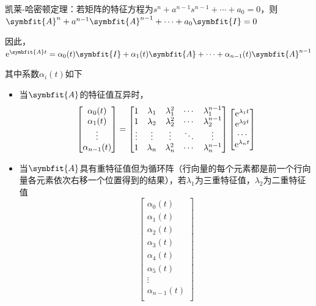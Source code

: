 \documentclass[11pt,a4paper]{ctexart}
\newcommand{\e}{{\rm e}}
\newcommand{\bm}{\symbfit}
\begin{document}
\begin{itemize}
            凯莱-哈密顿定理：若矩阵的特征方程为$s^n+a^{n-1}s^{n-1}+\cdots+a_0=0$，则$\bm{A}^n+a^{n-1}\bm{A}^{n-1}+\cdots+a_0\bm{I}=0$

            因此，$\e^{\bm{A}t}=\alpha_0(t)\bm{I}+\alpha_1(t)\bm{A}+\cdots+\alpha_{n-1}(t)\bm{A}^{n-1}$

            其中系数$\alpha_i(t)$如下
            \begin{itemize}
                \item 当$\bm{A}$的特征值互异时，
                \[
                \begin{bmatrix}
                    \alpha_0(t)\\\alpha_1(t)\\\vdots\\\alpha_{n-1}(t)
                \end{bmatrix}=
                \begin{bmatrix}
                    1 & \lambda_1 & \lambda_1^2 & \cdots & \lambda_1^{n-1}\\
                    1 & \lambda_2 & \lambda_2^2 & \cdots & \lambda_2^{n-1}\\
                    \vdots & \vdots & \vdots & \ddots & \vdots \\
                    1 & \lambda_n & \lambda_n^2 & \cdots & \lambda_n^{n-1}\\
                \end{bmatrix}
                \begin{bmatrix}
                    \e^{\lambda_1t}\\ \e^{\lambda_2t}\\ \cdots \\ \e^{\lambda_nt} \\
                \end{bmatrix}
                \]
                \item 当$\bm{A}$具有重特征值但为循环阵（行向量的每个元素都是前一个行向量各元素依次右移一个位置得到的结果），若$\lambda_1$为三重特征值，$\lambda_2$为二重特征值
                \[
                \begin{bmatrix}
                    \alpha_0(t)\\\alpha_1(t)\\\alpha_2(t)\\\alpha_3(t)\\\alpha_4(t)\\\alpha_5(t)\\\vdots\\\alpha_{n-1}(t)\\

\end{bmatrix}\]
\end{itemize}
\end{itemize}
\end{document}
